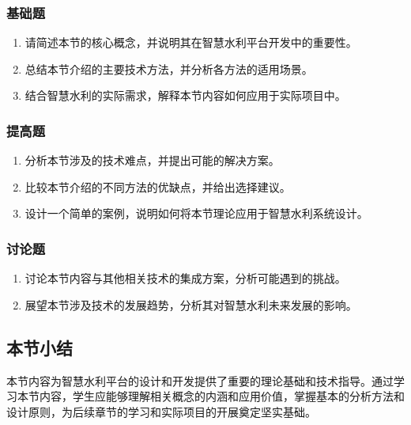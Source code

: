 \subsubsection{基础题}\label{ux57faux7840ux9898-4}

\begin{enumerate}
\def\labelenumi{\arabic{enumi}.}
\tightlist
\item
  请简述本节的核心概念，并说明其在智慧水利平台开发中的重要性。
\item
  总结本节介绍的主要技术方法，并分析各方法的适用场景。
\item
  结合智慧水利的实际需求，解释本节内容如何应用于实际项目中。
\end{enumerate}

\subsubsection{提高题}\label{ux63d0ux9ad8ux9898-4}

\begin{enumerate}
\def\labelenumi{\arabic{enumi}.}
\setcounter{enumi}{3}
\tightlist
\item
  分析本节涉及的技术难点，并提出可能的解决方案。
\item
  比较本节介绍的不同方法的优缺点，并给出选择建议。
\item
  设计一个简单的案例，说明如何将本节理论应用于智慧水利系统设计。
\end{enumerate}

\subsubsection{讨论题}\label{ux8ba8ux8bbaux9898-4}

\begin{enumerate}
\def\labelenumi{\arabic{enumi}.}
\setcounter{enumi}{6}
\tightlist
\item
  讨论本节内容与其他相关技术的集成方案，分析可能遇到的挑战。
\item
  展望本节涉及技术的发展趋势，分析其对智慧水利未来发展的影响。
\end{enumerate}

\subsection{本节小结}\label{ux672cux8282ux5c0fux7ed3-3}

本节内容为智慧水利平台的设计和开发提供了重要的理论基础和技术指导。通过学习本节内容，学生应能够理解相关概念的内涵和应用价值，掌握基本的分析方法和设计原则，为后续章节的学习和实际项目的开展奠定坚实基础。


